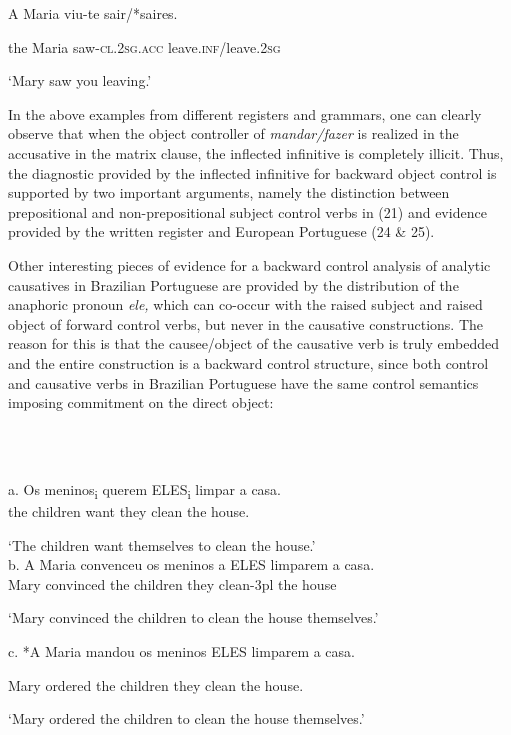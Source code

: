 \documentclass[output=paper]{langsci/langscibook}
\begin{document}
A   Maria viu-te           sair/*saires.

  the Maria saw-\textsc{cl.2sg.acc} leave.\textsc{inf}/leave.\textsc{2sg}

  ‘Mary saw you leaving.’

In the above examples from different registers and grammars, one can clearly observe that when the object controller of \textit{mandar/fazer}\textbf{ }is realized in the accusative in the matrix clause, the inflected infinitive is completely illicit. Thus, the diagnostic provided by the inflected infinitive for backward object control is supported by two important arguments, namely the distinction between prepositional and non{}-prepositional subject control verbs in (21) and evidence provided by the written register and European Portuguese (24 \& 25).

Other interesting pieces of evidence for a backward control analysis of analytic causatives in Brazilian Portuguese are provided by the distribution of the anaphoric pronoun \textit{ele,} which can co-occur with the raised subject and raised object of forward control verbs, but never in the causative constructions. The reason for this is that the causee/object of the causative verb is truly embedded and the entire construction is a backward control structure, since both control and causative verbs in Brazilian Portuguese have the same control semantics imposing commitment on the direct object:

\ea%
    \label{ex:key:26}
    \gll\\
        \\
    \glt
    \z

          a.   Os meninos\textsubscript{i} querem ELES\textsubscript{i} limpar a casa.\\
              the children  want     they     clean the house.

‘The children want themselves to clean the house.’\\
 b.   A Maria convenceu os meninos a ELES limparem a casa.\\
    Mary      convinced the children they clean-3pl the house

‘Mary convinced the children to clean the house themselves.’

c.  *A Maria mandou os meninos ELES limparem a casa.

    Mary        ordered the children they    clean       the house.

    ‘Mary ordered the children to clean the house themselves.’     
\end{document}
